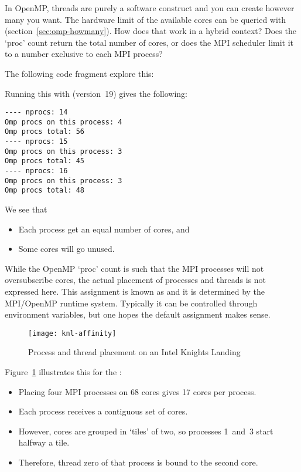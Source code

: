 In OpenMP, threads are purely a software construct and you can create
however many you want.
The hardware limit of the available cores can be queried with
 (section~\ref{sec:omp-howmany}).
How does that work in a hybrid context?
Does the `proc' count return the total number of cores,
or does the MPI scheduler limit it to a number exclusive to each MPI process?

The following code fragment explore this:


Running this with  (version~19)
gives the following:
\begin{verbatim}
---- nprocs: 14
Omp procs on this process: 4
Omp procs total: 56
---- nprocs: 15
Omp procs on this process: 3
Omp procs total: 45
---- nprocs: 16
Omp procs on this process: 3
Omp procs total: 48
\end{verbatim}
We see that
\begin{itemize}
\item Each process get an equal number of cores, and
\item Some cores will go unused.
\end{itemize}

While the OpenMP `proc' count is such that the MPI processes will not
oversubscribe cores, the actual placement of processes and threads
is not expressed here.
This assignment is known as  and it is
determined by the MPI/OpenMP runtime system.
Typically it can be controlled through environment variables,
but one hopes the default assignment makes sense.
\begin{figure}[ht]
  \texttt{[image: knl-affinity]}
  \caption{Process and thread placement on an Intel Knights Landing}
  \label{fig:knl-affinity}
\end{figure}
Figure~\ref{fig:knl-affinity} illustrates this for the
:
\begin{itemize}
\item Placing four MPI processes on 68 cores gives 17 cores per process.
\item Each process receives a contiguous set of cores.
\item However, cores are grouped in `tiles' of two, so processes 1~and~3 start
  halfway a tile.
\item Therefore, thread zero of that process is bound to the second core.
\end{itemize}

